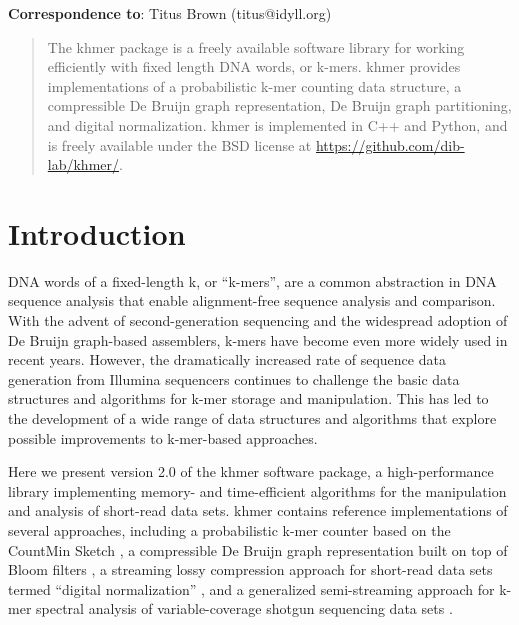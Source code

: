 \documentclass[10pt,a4paper]{article}
\begin{document}
\maketitle
\thispagestyle{fancy}
\textbf{Correspondence to}: Titus Brown (titus@idyll.org)
\begin{abstract}

The khmer package is a freely available software library for working efficiently with fixed length DNA words, or k-mers.  khmer provides implementations of a probabilistic k-mer counting data structure, a compressible De Bruijn graph representation, De Bruijn graph
partitioning, and digital normalization.  khmer is implemented in C++ and Python, and is freely available under the BSD license at \url{https://github.com/dib-lab/khmer/}.

\end{abstract}
\clearpage

\twocolumn

\section*{Introduction}


DNA words of a fixed-length k, or ``k-mers'', are a common abstraction
in DNA sequence analysis that enable alignment-free sequence analysis
and comparison. With the advent of second-generation
sequencing and the widespread adoption of De Bruijn graph-based
assemblers, k-mers have become even more widely used in recent years.
However, the
dramatically increased rate of sequence data generation from Illumina sequencers
continues to challenge the basic
data structures and algorithms for k-mer storage and manipulation.
This has led to the development of a wide range of data structures and
algorithms that explore possible improvements to k-mer-based
approaches.

Here we present version 2.0 of the khmer software package, a
high-performance library implementing memory- and time-efficient
algorithms for the manipulation and analysis of short-read data sets.  khmer
contains reference implementations of several approaches, including a
probabilistic k-mer counter based on the CountMin Sketch \cite{zhang2014}, a
compressible De Bruijn graph representation built on top of Bloom
filters \cite{Pell2012}, a streaming lossy compression approach for
short-read data sets termed ``digital normalization'' \cite{Brown2012},
and a generalized semi-streaming approach for k-mer spectral analysis of
variable-coverage shotgun sequencing data sets \cite{zhang2015crossing}.
\end{document}
